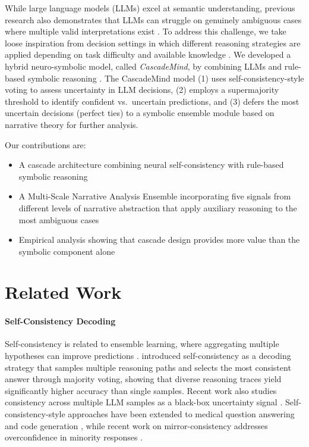 \documentclass[11pt]{article}
\begin{document}
While large language models (LLMs) excel at semantic understanding, previous research also demonstrates that LLMs can struggle on genuinely ambiguous cases where multiple valid interpretations exist \cite{keluskar2024llms}. To address this challenge, we take loose inspiration from decision settings in which different reasoning strategies are applied depending on task difficulty and available knowledge \cite{kahneman2011fast}. We developed a hybrid neuro-symbolic model, called \textit{CascadeMind}, by combining LLMs and rule-based symbolic reasoning \citep{garcez2023neurosymbolic}. The CascadeMind model (1) uses self-consistency-style voting \citep{wang2022self} to assess uncertainty in LLM decisions, (2) employs a supermajority threshold to identify confident vs.~uncertain predictions, and (3) defers the most uncertain decisions (perfect ties) to a symbolic ensemble module based on narrative theory for further analysis.

Our contributions are:
\begin{itemize}
    \item A cascade architecture combining neural self-consistency with rule-based symbolic reasoning
    \item A Multi-Scale Narrative Analysis Ensemble incorporating five signals from different levels of narrative abstraction that apply auxiliary reasoning to the most ambiguous cases
    \item Empirical analysis showing that cascade design provides more value than the symbolic component alone
\end{itemize}

\section{Related Work}

\paragraph{Self-Consistency Decoding}
Self-consistency is related to ensemble learning, where aggregating multiple hypotheses can improve predictions \cite{hansen2002neural}. \citet{wang2022self} introduced self-consistency as a decoding strategy that samples multiple reasoning paths and selects the most consistent answer through majority voting, showing that diverse reasoning traces yield significantly higher accuracy than single samples. Recent work also studies consistency across multiple LLM samples as a black-box uncertainty signal \citep{xiong2024uncertainty}. Self-consistency-style approaches have been extended to medical question answering \citep{maharjan2024openmedlm} and code generation \citep{huang2023enhancing}, while recent work on mirror-consistency addresses overconfidence in minority responses \citep{huang2024mirror}.
\end{document}
